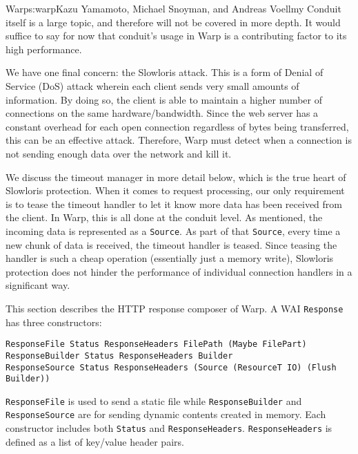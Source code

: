 \begin{aosachapter}{Warp}{s:warp}{Kazu Yamamoto, Michael Snoyman, and Andreas Voellmy}
Conduit itself is a large topic, and therefore will not be covered in
more depth. It would suffice to say for now that conduit's usage in Warp
is a contributing factor to its high performance.


We have one final concern: the Slowloris attack. This is a form of
Denial of Service (DoS) attack wherein each client sends very small
amounts of information. By doing so, the client is able to maintain a
higher number of connections on the same hardware/bandwidth. Since the
web server has a constant overhead for each open connection regardless
of bytes being transferred, this can be an effective attack. Therefore,
Warp must detect when a connection is not sending enough data over the
network and kill it.

We discuss the timeout manager in more detail below, which is the true
heart of Slowloris protection. When it comes to request processing, our
only requirement is to tease the timeout handler to let it know more
data has been received from the client. In Warp, this is all done at the
conduit level. As mentioned, the incoming data is represented as a
\texttt{Source}. As part of that \texttt{Source}, every time a new chunk
of data is received, the timeout handler is teased. Since teasing the
handler is such a cheap operation (essentially just a memory write),
Slowloris protection does not hinder the performance of individual
connection handlers in a significant way.


This section describes the HTTP response composer of Warp. A WAI
\texttt{Response} has three constructors:

\begin{verbatim}
ResponseFile Status ResponseHeaders FilePath (Maybe FilePart)
ResponseBuilder Status ResponseHeaders Builder
ResponseSource Status ResponseHeaders (Source (ResourceT IO) (Flush Builder))
\end{verbatim}

\texttt{ResponseFile} is used to send a static file while
\texttt{ResponseBuilder} and \texttt{ResponseSource} are for sending
dynamic contents created in memory. Each constructor includes both
\texttt{Status} and \texttt{ResponseHeaders}. \texttt{ResponseHeaders}
is defined as a list of key/value header pairs.


\label{sec.warp.composer}


\end{aosachapter}
